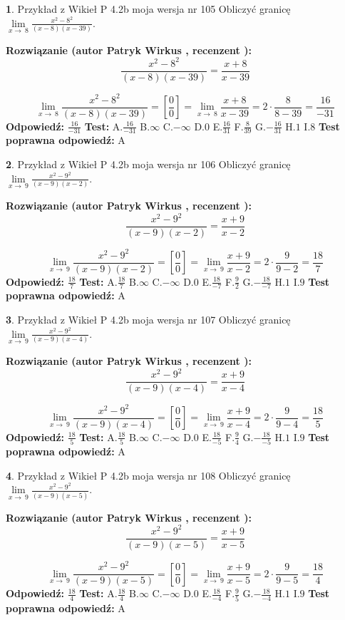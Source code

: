 \documentclass[12pt, a4paper]{article}
\theoremstyle{definition} %
\newtheorem{zad}{}
\newcommand{\zadStart}[1]{\begin{zad}#1\newline}
\newcommand{\zadStop}{\end{zad}}
\newcommand{\rozwStart}[2]{\noindent \textbf{Rozwiązanie (autor #1 , recenzent #2): }\newline}
\newcommand{\rozwStop}{\newline}
\newcommand{\odpStart}{\noindent \textbf{Odpowiedź:}\newline}
\newcommand{\odpStop}{\newline}
\newcommand{\testStart}{\noindent \textbf{Test:}\newline}
\newcommand{\testStop}{\newline}
\newcommand{\kluczStart}{\noindent \textbf{Test poprawna odpowiedź:}\newline}
\newcommand{\kluczStop}{\newline}
\begin{document}
\zadStart{Przykład z Wikieł P 4.2b moja wersja nr 105}
Obliczyć granicę $\lim\limits_{x\to\ 8}\frac{x^{2}-8^{2}}{(x-8)(x-39)}$.
\zadStop
\rozwStart{Patryk Wirkus}{}
$$\frac{x^{2}-8^{2}}{(x-8)(x-39)}=\frac{x+8}{x-39}$$

$$\lim\limits_{x\to\ 8}\frac{x^{2}-8^{2}}{(x-8)(x-39)}=[\frac{0}{0}]=\lim\limits_{x\to\ 8}\frac{x+8}{x-39}=2 \cdot \frac{8}{8-39} = \frac{16}{-31}$$
\rozwStop
\odpStart
$\frac{16}{-31}$
\odpStop
\testStart
A.$\frac{16}{-31}$
B.$\infty$
C.$-\infty$
D.$0$
E.$\frac{16}{31}$
F.$\frac{8}{39}$
G.$-\frac{16}{31}$
H.$1$
I.$8$
\testStop
\kluczStart
A
\kluczStop



\zadStart{Przykład z Wikieł P 4.2b moja wersja nr 106}
Obliczyć granicę $\lim\limits_{x\to\ 9}\frac{x^{2}-9^{2}}{(x-9)(x-2)}$.
\zadStop
\rozwStart{Patryk Wirkus}{}
$$\frac{x^{2}-9^{2}}{(x-9)(x-2)}=\frac{x+9}{x-2}$$

$$\lim\limits_{x\to\ 9}\frac{x^{2}-9^{2}}{(x-9)(x-2)}=[\frac{0}{0}]=\lim\limits_{x\to\ 9}\frac{x+9}{x-2}=2 \cdot \frac{9}{9-2} = \frac{18}{7}$$
\rozwStop
\odpStart
$\frac{18}{7}$
\odpStop
\testStart
A.$\frac{18}{7}$
B.$\infty$
C.$-\infty$
D.$0$
E.$\frac{18}{-7}$
F.$\frac{9}{2}$
G.$-\frac{18}{-7}$
H.$1$
I.$9$
\testStop
\kluczStart
A
\kluczStop



\zadStart{Przykład z Wikieł P 4.2b moja wersja nr 107}
Obliczyć granicę $\lim\limits_{x\to\ 9}\frac{x^{2}-9^{2}}{(x-9)(x-4)}$.
\zadStop
\rozwStart{Patryk Wirkus}{}
$$\frac{x^{2}-9^{2}}{(x-9)(x-4)}=\frac{x+9}{x-4}$$

$$\lim\limits_{x\to\ 9}\frac{x^{2}-9^{2}}{(x-9)(x-4)}=[\frac{0}{0}]=\lim\limits_{x\to\ 9}\frac{x+9}{x-4}=2 \cdot \frac{9}{9-4} = \frac{18}{5}$$
\rozwStop
\odpStart
$\frac{18}{5}$
\odpStop
\testStart
A.$\frac{18}{5}$
B.$\infty$
C.$-\infty$
D.$0$
E.$\frac{18}{-5}$
F.$\frac{9}{4}$
G.$-\frac{18}{-5}$
H.$1$
I.$9$
\testStop
\kluczStart
A
\kluczStop



\zadStart{Przykład z Wikieł P 4.2b moja wersja nr 108}
Obliczyć granicę $\lim\limits_{x\to\ 9}\frac{x^{2}-9^{2}}{(x-9)(x-5)}$.
\zadStop
\rozwStart{Patryk Wirkus}{}
$$\frac{x^{2}-9^{2}}{(x-9)(x-5)}=\frac{x+9}{x-5}$$

$$\lim\limits_{x\to\ 9}\frac{x^{2}-9^{2}}{(x-9)(x-5)}=[\frac{0}{0}]=\lim\limits_{x\to\ 9}\frac{x+9}{x-5}=2 \cdot \frac{9}{9-5} = \frac{18}{4}$$
\rozwStop
\odpStart
$\frac{18}{4}$
\odpStop
\testStart
A.$\frac{18}{4}$
B.$\infty$
C.$-\infty$
D.$0$
E.$\frac{18}{-4}$
F.$\frac{9}{5}$
G.$-\frac{18}{-4}$
H.$1$
I.$9$
\testStop
\kluczStart
A
\kluczStop
\end{document}
